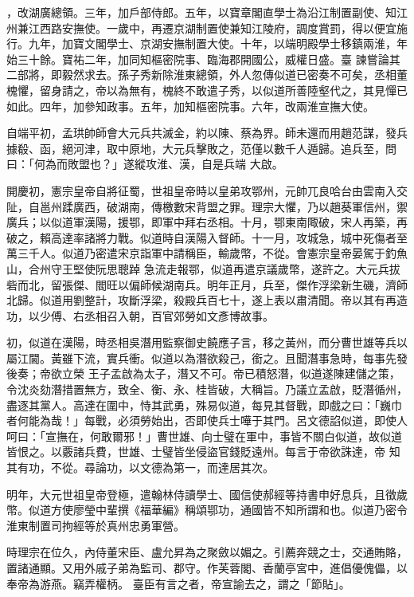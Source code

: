 \begin{pinyinscope}
 ，改湖廣總領。三年，加戶部侍郎。五年，以寶章閣直學士為沿江制置副使、知江州兼江西路安撫使。一歲中，再遷京湖制置使兼知江陵府，調度賞罰，得以便宜施行。九年，加寶文閣學士、京湖安撫制置大使。十年，以端明殿學士移鎮兩淮，年始三十餘。寶祐二年，加同知樞密院事、臨海郡開國公，威權日盛。臺
 諫嘗論其二部將，即毅然求去。孫子秀新除淮東總領，外人忽傳似道已密奏不可矣，丞相董槐懼，留身請之，帝以為無有，槐終不敢遣子秀，以似道所善陸壑代之，其見憚已如此。四年，加參知政事。五年，加知樞密院事。六年，改兩淮宣撫大使。



 自端平初，孟珙帥師會大元兵共滅金，約以陳、蔡為界。師未還而用趙范謀，發兵據殽、函，絕河津，取中原地，大元兵擊敗之，范僅以數千人遁歸。追兵至，問曰：「何為而敗盟也？」遂縱攻淮、漢，自是兵端
 大啟。



 開慶初，憲宗皇帝自將征蜀，世祖皇帝時以皇弟攻鄂州，元帥兀良哈台由雲南入交阯，自邕州蹂廣西，破湖南，傳檄數宋背盟之罪。理宗大懼，乃以趙葵軍信州，禦廣兵；以似道軍漢陽，援鄂，即軍中拜右丞相。十月，鄂東南陬破，宋人再築，再破之，賴高達率諸將力戰。似道時自漢陽入督師。十一月，攻城急，城中死傷者至萬三千人。似道乃密遣宋京詣軍中請稱臣，輸歲幣，不從。會憲宗皇帝晏駕于釣魚山，合州守王堅使阮思聰踔
 急流走報鄂，似道再遣京議歲幣，遂許之。大元兵拔砦而北，留張傑、閻旺以偏師候湖南兵。明年正月，兵至，傑作浮梁新生磯，濟師北歸。似道用劉整計，攻斷浮梁，殺殿兵百七十，遂上表以肅清聞。帝以其有再造功，以少傅、右丞相召入朝，百官郊勞如文彥博故事。



 初，似道在漢陽，時丞相吳潛用監察御史饒應子言，移之黃州，而分曹世雄等兵以屬江閫。黃雖下流，實兵衝。似道以為潛欲殺己，銜之。且聞潛事急時，每事先發後奏；帝欲立榮
 王子孟啟為太子，潛又不可。帝已積怒潛，似道遂陳建儲之策，令沈炎劾潛措置無方，致全、衡、永、桂皆破，大稱旨。乃議立孟啟，貶潛循州，盡逐其黨人。高達在圍中，恃其武勇，殊易似道，每見其督戰，即戲之曰：「巍巾者何能為哉！」每戰，必須勞始出，否即使兵士嘩于其門。呂文德諂似道，即使人呵曰：「宣撫在，何敢爾邪！」曹世雄、向士璧在軍中，事皆不關白似道，故似道皆恨之。以覈諸兵費，世雄、士璧皆坐侵盜官錢貶遠州。每言于帝欲誅達，帝
 知其有功，不從。尋論功，以文德為第一，而達居其次。



 明年，大元世祖皇帝登極，遣翰林侍讀學士、國信使郝經等持書申好息兵，且徵歲幣。似道方使廖瑩中輩撰《福華編》稱頌鄂功，通國皆不知所謂和也。似道乃密令淮東制置司拘經等於真州忠勇軍營。



 時理宗在位久，內侍董宋臣、盧允昇為之聚斂以媚之。引薦奔競之士，交通賄賂，置諸通顯。又用外戚子弟為監司、郡守。作芙蓉閣、香蘭亭宮中，進倡優傀儡，以奉帝為游燕。竊弄權柄。
 臺臣有言之者，帝宣諭去之，謂之「節貼」。




\end{pinyinscope}
